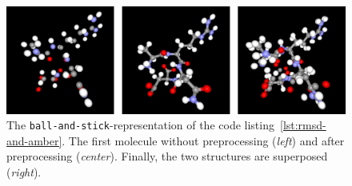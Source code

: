 \begin{figure}[t]
	\includegraphics[width=18cm]{gfx/biovis.png}
	\caption{The \texttt{ball-and-stick}-representation of the code listing~\ref{lst:rmsd-and-amber}. The first molecule without preprocessing (\textit{left}) and after preprocessing (\textit{center}). Finally, the two structures are superposed (\textit{right}).}
	\label{fig:biochem_visualization}
\end{figure}